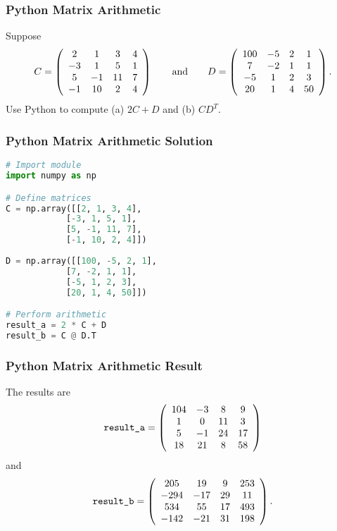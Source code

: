 \documentclass{beamer}
\begin{document}
\begin{frame}
\frametitle{Python Matrix Arithmetic}
\begin{Example}
Suppose
$$
C = \left(\begin{array}{c c c c} 2		& 	1	&	3	&	4\\	-3	&	1	&	5	&	1\\	5	&	-1	&	11	&	7\\	-1	&	10	&	2	&4 \end{array}\right)
\qquad\text{and}\qquad
D =  \left(\begin{array}{c c c c} 100	& 	-5	&	2	&	1\\	7	&	-2	&	1	&	1\\	-5	&	1	&	2	&	3\\	20	&	1	&	4	&	50 \end{array}\right).
$$
Use Python to compute (a) $2C + D$ and (b) $C D^T$.
\end{Example}

\end{frame}

\begin{frame}[fragile]
\frametitle{Python Matrix Arithmetic Solution}
\begin{lstlisting}[language=Python]
# Import module
import numpy as np

# Define matrices
C = np.array([[2, 1, 3, 4], 
			[-3, 1, 5, 1], 
			[5, -1, 11, 7], 
			[-1, 10, 2, 4]])
			
D = np.array([[100, -5, 2, 1], 
			[7, -2, 1, 1], 
			[-5, 1, 2, 3], 
			[20, 1, 4, 50]])

# Perform arithmetic 
result_a = 2 * C + D
result_b = C @ D.T
\end{lstlisting}
\end{frame}

\begin{frame}
\frametitle{Python Matrix Arithmetic Result}
The results are
$$
\texttt{result\_a}  = \left(\begin{array}{c c c c} 104	&	-3	&	8	&	9\\	1	&	0	&	11	&	3\\ 5	&	-1	&	24	&	17\\	18	&	21	&	8	&	58 \end{array}\right)
$$
and
$$
\texttt{result\_b}	= \left(\begin{array}{c c c c} 205	&	19	&	9	&	253\\	-294	&	-17	&	29	&	11\\ 534	&	55	&	17	&	493\\	-142	&	-21	&	31	&	198 \end{array}\right).
$$

\end{frame}
\end{document}
